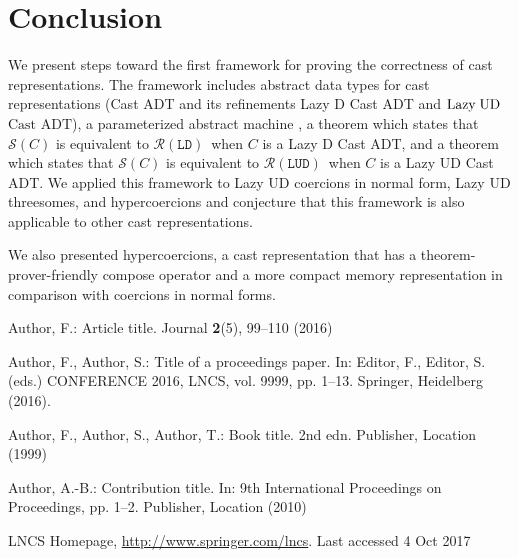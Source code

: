 \documentclass[runningheads]{llncs}
\newcommand{\LUD}{\ensuremath{\text{Lazy\;UD}}}
\newcommand{\CastADT}{\ensuremath{\text{Cast ADT}}}
\newcommand{\RMachine}[1]{\ensuremath{\mathcal{R}(#1)}}
\newcommand{\LDMachine}{\RMachine{\BLD}}
\newcommand{\LUDMachine}{\RMachine{\BLUD}}
\newcommand{\SMachine}[1]{\ensuremath{\mathcal{S}(#1)}}
\newcommand{\BLD}[0]{\ensuremath{\mathtt{LD}}}
\newcommand{\BLUD}[0]{\ensuremath{\mathtt{LUD}}}
\begin{document}
\section{Conclusion} \label{sec:conclusion}

We present steps toward the first framework for proving the
correctness of cast representations.
%
The framework includes abstract data types for cast representations
(Cast ADT and its refinements Lazy D Cast ADT and \LUD\ \CastADT), 
a parameterized abstract machine , 
a theorem which states that \SMachine{C} is equivalent
to \LDMachine\ when $C$ is a Lazy D Cast ADT, and
a theorem which states that \SMachine{C} is equivalent
to \LUDMachine\ when $C$ is a Lazy UD Cast ADT.
%
%
We applied this framework to Lazy UD coercions in normal form,
Lazy UD threesomes, and hypercoercions and conjecture that
this framework is also applicable to other cast representations.

We also presented hypercoercions, a cast representation that has a 
theorem-prover-friendly compose operator and a more compact memory
representation in comparison with coercions in normal forms.

%
%
%
% 
% 
%

{}

\begin{thebibliography}{8}
Author, F.: Article title. Journal \textbf{2}(5), 99--110 (2016)

Author, F., Author, S.: Title of a proceedings paper. In: Editor,
F., Editor, S. (eds.) CONFERENCE 2016, LNCS, vol. 9999, pp. 1--13.
Springer, Heidelberg (2016). 

Author, F., Author, S., Author, T.: Book title. 2nd edn. Publisher,
Location (1999)

Author, A.-B.: Contribution title. In: 9th International Proceedings
on Proceedings, pp. 1--2. Publisher, Location (2010)

LNCS Homepage, \url{http://www.springer.com/lncs}. Last accessed 4
Oct 2017
\end{thebibliography}
\end{document}
